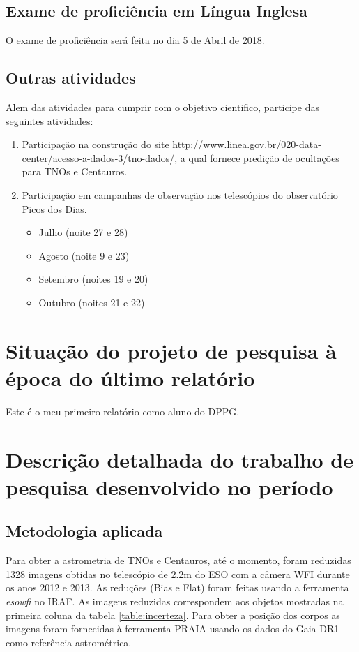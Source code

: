 \documentclass[a4paper, 11pt]{article}
\begin{document}
\subsection{Exame de profici\^encia em L\'ingua Inglesa}
O exame de proficiência será feita no dia 5 de Abril de 2018.

\subsection{Outras atividades}

Alem das atividades para cumprir com o objetivo cientifico, participe das seguintes atividades:

\begin{enumerate}
  \item Participação na construção do site \url{http://www.linea.gov.br/020-data-center/acesso-a-dados-3/tno-dados/}, a qual fornece predição de ocultações para TNOs e Centauros. 
  \item Participação em campanhas de observação nos telescópios do observatório Picos dos Dias. 
  \begin{itemize}
    \item Julho (noite 27 e 28)
    \item Agosto (noite 9 e 23) %
    \item Setembro (noites 19 e 20)
    \item Outubro (noites 21 e 22)
  \end{itemize}
\end{enumerate}
\section{Situação do projeto de pesquisa à época do último relatório}
Este é o meu primeiro relatório como aluno do DPPG.
\section{Descrição detalhada do trabalho de pesquisa desenvolvido no período}

\subsection{Metodologia aplicada}
Para obter a astrometria de TNOs e Centauros, at\'e o momento, foram reduzidas 1328 imagens obtidas no telesc\'opio de 2.2m do ESO com a c\^amera WFI durante os anos 2012 e 2013. As reduções (Bias e Flat) foram feitas usando a ferramenta \textit{esowfi} no IRAF. As imagens reduzidas correspondem aos objetos mostradas na primeira coluna da tabela \ref{table:incerteza}. Para obter a posição dos corpos as imagens foram fornecidas à ferramenta PRAIA usando os dados do Gaia DR1 como refer\^encia astrom\'etrica. 
\end{document}
